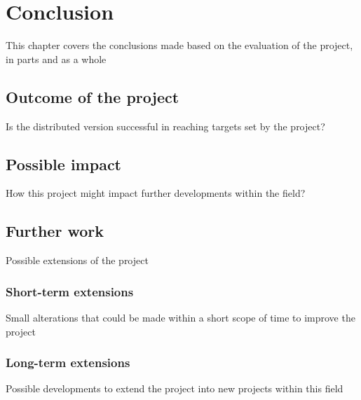 \chapter{Conclusion}

This chapter covers the conclusions made based on the evaluation of the project, in parts and as a whole

\section{Outcome of the project}

Is the distributed version successful in reaching targets set by the project?

\section{Possible impact}

How this project might impact further developments within the field?

\section{Further work}

Possible extensions of the project

\subsection{Short-term extensions}

Small alterations that could be made within a short scope of time to improve the project

\subsection{Long-term extensions}

Possible developments to extend the project into new projects within this field
